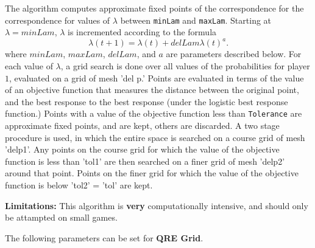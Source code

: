 The algorithm computes approximate fixed points of the correspondence
for the correspondence for values of $\lambda$ between \verb+minLam+
and \verb+maxLam+.  Starting at $\lambda = minLam$, $\lambda$ is
incremented according to the formula $$ \lambda(t+1) = \lambda(t)
+delLam \lambda(t)^a.$$ where $minLam$, $maxLam$, $delLam$, and $a$
are parameters described below. For each value of $\lambda$, a grid
search is done over all values of the probabilities for player $1$,
evaluated on a grid of mesh 'del p.'  Points are evaluated in terms of
the value of an objective function that measures the distance between
the original point, and the best response to the best response (under
the logistic best response function.)  Points with a value of the
objective function less than \verb+Tolerance+ are approximate fixed
points, and are kept, others are discarded.  A two stage procedure is
used, in which the entire space is searched on a course grid of mesh
'delp1'.  Any points on the course grid for which the value of the
objective function is less than 'tol1' are then searched on a finer
grid of mesh 'delp2' around that point.  Points on the finer grid for
which the value of the objective function is below 'tol2' = 'tol' are
kept.

{\bf Limitations:} This algorithm is {\bf very} computationally
intensive, and should only be attampted on small games.

The following parameters can be set for {\bf QRE Grid}.

